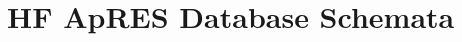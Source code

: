 \documentclass[a4paper,12pt]{article}
\renewcommand{\arraystretch}{1.5}
\newcommand{\ProtocolTable}[6]
{
\begin{table}[]
\begin{tabular}{|p{1.8cm} p{3.8cm} p{1.8cm} p{2.0cm}|}
\hline
 \rowcolor{beaublue}\textbf{Name}:&\multicolumn{3}{l}{#1} Note \\
 \rowcolor{beaublue}\textbf{Folder:}&\multicolumn{3}{l}{#2} Note \\
 \rowcolor{beaublue}\textbf{Instrument:}&#3&\textbf{Date:}&#4 Note \\
  \rowcolor{beaublue}\textbf{Operator:}&#5&\textbf{Location:}&#6\\
\hline
\end{tabular}
\end{table}
}
\begin{document}

%


\clearpage
\appendix
\section{HF ApRES Database Schemata}
\label{AppendixHFApRESDatabaseSchemata}

\newcommand{\sqlspectable}[2]{
    \renewcommand{\arraystretch}{1.5}
    \rowcolors{2}{gray!10}{white}
    \begin{longtable}{l l >{\raggedright}p{3cm} >{\raggedright\arraybackslash}p{4cm}}
        \caption{#2} \\
        \hline
        \rowcolor{gray!50}
        \textbf{Fieldname} & \textbf{Datatype} & \textbf{Parameters} & \textbf{Description}\\
        \hline
        \endhead
        \hline
        \endfoot
        #1
    \end{longtable}
}
\end{document}
